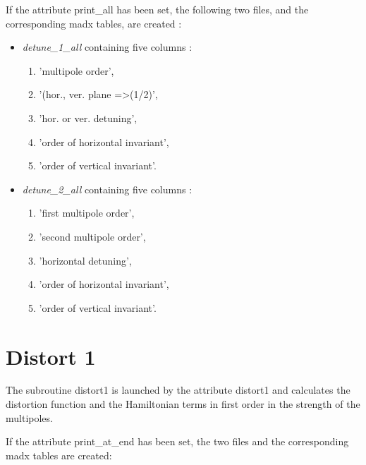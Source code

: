 If the attribute print\_all has been set, the following two files, and
the corresponding madx tables, are created :  

\begin{itemize}
   \item \textit{detune\_1\_all}  containing  five columns :  
     \begin{enumerate}
        \item 'multipole order', 
        \item '(hor., ver. plane =\textgreater (1/2)',  
        \item 'hor. or ver. detuning', 
        \item 'order of horizontal invariant', 
        \item 'order of vertical invariant'. 
     \end{enumerate}
   \item \textit{detune\_2\_all}  containing five columns :  
     \begin{enumerate}
        \item 'first multipole order', 
        \item 'second multipole order',  
        \item 'horizontal detuning', 
        \item 'order of horizontal invariant', 
        \item 'order of vertical invariant'. 
     \end{enumerate}
\end{itemize}
 
\section{Distort 1}
The subroutine distort1 is launched by the attribute distort1 and
calculates the distortion function and the Hamiltonian terms in first
order in the strength of the multipoles. 

If the attribute print\_at\_end has been set, the two files and the
corresponding madx tables are created:  

